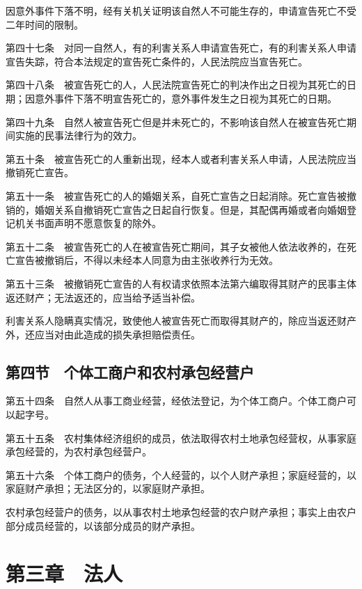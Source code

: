 \documentclass[UTF8,12pt,a4paper]{ctexbook}
\begin{document}
因意外事件下落不明，经有关机关证明该自然人不可能生存的，申请宣告死亡不受二年时间的限制。

第四十七条　对同一自然人，有的利害关系人申请宣告死亡，有的利害关系人申请宣告失踪，符合本法规定的宣告死亡条件的，人民法院应当宣告死亡。

第四十八条　被宣告死亡的人，人民法院宣告死亡的判决作出之日视为其死亡的日期；因意外事件下落不明宣告死亡的，意外事件发生之日视为其死亡的日期。

第四十九条　自然人被宣告死亡但是并未死亡的，不影响该自然人在被宣告死亡期间实施的民事法律行为的效力。

第五十条　被宣告死亡的人重新出现，经本人或者利害关系人申请，人民法院应当撤销死亡宣告。

第五十一条　被宣告死亡的人的婚姻关系，自死亡宣告之日起消除。死亡宣告被撤销的，婚姻关系自撤销死亡宣告之日起自行恢复。但是，其配偶再婚或者向婚姻登记机关书面声明不愿意恢复的除外。

第五十二条　被宣告死亡的人在被宣告死亡期间，其子女被他人依法收养的，在死亡宣告被撤销后，不得以未经本人同意为由主张收养行为无效。

第五十三条　被撤销死亡宣告的人有权请求依照本法第六编取得其财产的民事主体返还财产；无法返还的，应当给予适当补偿。

利害关系人隐瞒真实情况，致使他人被宣告死亡而取得其财产的，除应当返还财产外，还应当对由此造成的损失承担赔偿责任。

\subsection*{第四节　个体工商户和农村承包经营户}

第五十四条　自然人从事工商业经营，经依法登记，为个体工商户。个体工商户可以起字号。

第五十五条　农村集体经济组织的成员，依法取得农村土地承包经营权，从事家庭承包经营的，为农村承包经营户。

第五十六条　个体工商户的债务，个人经营的，以个人财产承担；家庭经营的，以家庭财产承担；无法区分的，以家庭财产承担。

农村承包经营户的债务，以从事农村土地承包经营的农户财产承担；事实上由农户部分成员经营的，以该部分成员的财产承担。

\section*{第三章　法人}
\end{document}
